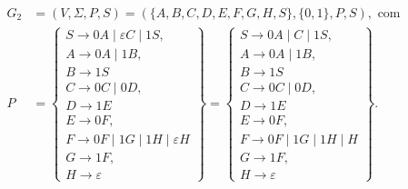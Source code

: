 \documentclass[12pt]{article}
\def\myling{{99}} %
\begin{document}
\begin{tcolorbox}[rounded corners, colback=yellow!5, colframe=red!40!black, title={Gramática $G_2$ que gera as cadeias da linguagem $\mathcal{L}_{\myling}$}]
 \begin{align*}
 G_2 &=(V,\Sigma,P,S)=(\{A,B,C,D,E,F,G,H,S\},\{0,1\},P,S), \text{ com}\\
   P &=
   \left\{\begin{array}{l}
    S \to 0A \mid \varepsilon C \mid 1S,\\
    A \to 0A \mid 1B,\\
    B \to 1S\\
    C \to 0C \mid 0D,\\
    D \to 1E\\
    E \to 0F,\\
    F \to 0F \mid 1G \mid 1H \mid \varepsilon H\\
    G \to 1F,\\
    H \to \varepsilon
   \end{array}\right\}
   =
   \left\{\begin{array}{l}
    S \to 0A \mid C \mid 1S,\\
    A \to 0A \mid 1B,\\
    B \to 1S\\
    C \to 0C \mid 0D,\\
    D \to 1E\\
    E \to 0F,\\
    F \to 0F \mid 1G \mid 1H \mid H\\
    G \to 1F,\\
    H \to \varepsilon
   \end{array}\right\}.
 \end{align*}
\end{tcolorbox}\bigskip
\end{document}
